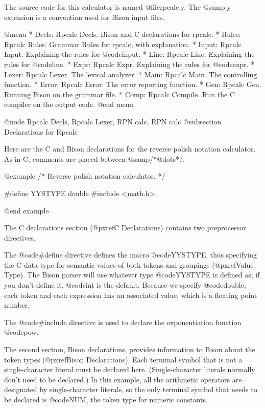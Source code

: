 {The source code for this calculator is named @file{rpcalc.y}.  The
@samp{.y} extension is a convention used for Bison input files.

@menu
* Decls: Rpcalc Decls.    Bison and C declarations for rpcalc.
* Rules: Rpcalc Rules.    Grammar Rules for rpcalc, with explanation.
* Input: Rpcalc Input.	  Explaining the rules for @code{input}.
* Line: Rpcalc Line.	  Explaining the rules for @code{line}.
* Expr: Rpcalc Expr.      Explaining the rules for @code{expr}.
* Lexer: Rpcalc Lexer.    The lexical analyzer.
* Main: Rpcalc Main.      The controlling function.
* Error: Rpcalc Error.    The error reporting function.
* Gen: Rpcalc Gen.        Running Bison on the grammar file.
* Comp: Rpcalc Compile.   Run the C compiler on the output code.
@end menu

@node Rpcalc Decls, Rpcalc Lexer, RPN calc, RPN calc
@subsection Declarations for Rpcalc

Here are the C and Bison declarations for the reverse polish notation
calculator.  As in C, comments are placed between @samp{/*@dots{}*/}.

@example
/* Reverse polish notation calculator. */

#define YYSTYPE double
#include <math.h>


@end example

The C declarations section (@pxref{C Declarations}) contains two
preprocessor directives.

The @code{#define} directive defines the macro @code{YYSTYPE}, thus
specifying the C data type for semantic values of both tokens and groupings
(@pxref{Value Type}).  The Bison parser will use whatever type
@code{YYSTYPE} is defined as; if you don't define it, @code{int} is the
default.  Because we specify @code{double}, each token and each expression
has an associated value, which is a floating point number.

The @code{#include} directive is used to declare the exponentiation
function @code{pow}.

The second section, Bison declarations, provides information to Bison about
the token types (@pxref{Bison Declarations}).  Each terminal symbol that is
not a single-character literal must be declared here.  (Single-character
literals normally don't need to be declared.)  In this example, all the
arithmetic operators are designated by single-character literals, so the
only terminal symbol that needs to be declared is @code{NUM}, the token
type for numeric constants.

}

